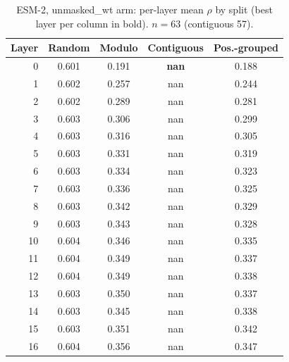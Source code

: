 \documentclass[11pt,a4paper]{article}
\begin{document}
\begin{table}[H]\centering\small

\caption{ESM-2, unmasked\_wt arm: per-layer mean $\rho$ by split (best layer per column in bold). $n=63$ (contiguous 57).}

\label{tab:S2ESM-2unmasked_wt}

\begin{tabular}{rcccc}

\toprule

Layer & Random & Modulo & Contiguous & Pos.-grouped \\

\midrule

0 & 0.601 & 0.191 & \textbf{nan} & 0.188 \\

1 & 0.602 & 0.257 & nan & 0.244 \\

2 & 0.602 & 0.289 & nan & 0.281 \\

3 & 0.603 & 0.306 & nan & 0.299 \\

4 & 0.603 & 0.316 & nan & 0.305 \\

5 & 0.603 & 0.331 & nan & 0.319 \\

6 & 0.603 & 0.334 & nan & 0.323 \\

7 & 0.603 & 0.336 & nan & 0.325 \\

8 & 0.603 & 0.342 & nan & 0.329 \\

9 & 0.603 & 0.343 & nan & 0.328 \\

10 & 0.604 & 0.346 & nan & 0.335 \\

11 & 0.604 & 0.349 & nan & 0.337 \\

12 & 0.604 & 0.349 & nan & 0.338 \\

13 & 0.603 & 0.350 & nan & 0.337 \\

14 & 0.603 & 0.345 & nan & 0.338 \\

15 & 0.603 & 0.351 & nan & 0.342 \\

16 & 0.604 & 0.356 & nan & 0.347 \\


\end{tabular}
\end{table}
\end{document}
